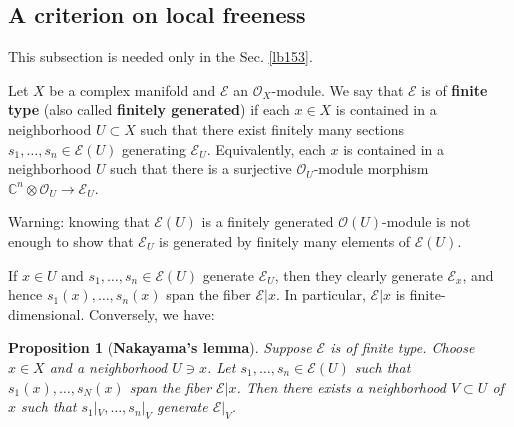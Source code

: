 \documentclass[12pt,a4paper,notitlepage]{article}
\theoremstyle{definition}
\theoremstyle{plain}
\newtheorem{pp}[df]{Proposition}
\newcommand{\scr}{\mathscr}
\newcommand{\Cbb}{\mathbb C}
\numberwithin{equation}{section}
\begin{document}
\subsection{A criterion on local freeness}

This subsection is needed only in the Sec. \ref{lb153}.

Let $X$ be a complex manifold and $\scr E$ an $\scr O_X$-module. We say that $\scr E$ is of \textbf{finite type} (also called \textbf{finitely generated}) if  each $x\in X$ is contained in a neighborhood $U\subset X$ such that there exist finitely many sections $s_1,\dots,s_n\in\scr E(U)$ generating $\scr E_U$. Equivalently, each $x$ is contained in a neighborhood $U$ such that there is a surjective $\scr O_U$-module morphism $\Cbb^n\otimes\scr O_U\rightarrow\scr E_U$.

Warning: knowing that $\scr E(U)$ is a finitely generated $\scr O(U)$-module is not enough to show that $\scr E_U$ is generated by finitely many elements of $\scr E(U)$.

If $x\in U$ and $s_1,\dots,s_n\in\scr E(U)$ generate $\scr E_U$, then they clearly generate $\scr E_x$, and hence $s_1(x),\dots,s_n(x)$ span the fiber $\scr E|x$. In particular, $\scr E|x$ is finite-dimensional. Conversely, we have:



\begin{pp}[\textbf{Nakayama's lemma}]
Suppose $\scr E$ is of finite type. Choose $x\in X$ and a neighborhood $U\ni x$. Let $s_1,\dots,s_n\in\scr E(U)$ such that $s_1(x),\dots,s_N(x)$ span the fiber $\scr E|x$. Then there exists a neighborhood $V\subset U$ of $x$ such that $s_1|_V,\dots,s_n|_V$ generate $\scr E|_V$.
\end{pp}
\end{document}
